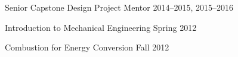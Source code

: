 \begin{outerlist}
\item Senior Capstone Design Project Mentor \hfill 2014--2015, 2015--2016


\end{outerlist}

\vspace{0.5\baselineskip}

\begin{outerlist}
\item Introduction to Mechanical Engineering \hfill Spring 2012
\end{outerlist}

\vspace{0.5\baselineskip}

\begin{outerlist}
\item Combustion for Energy Conversion \hfill Fall 2012
\end{outerlist}

